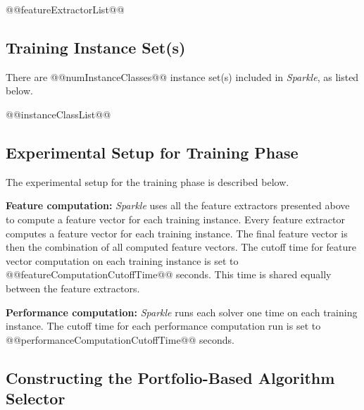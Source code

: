 \documentclass[british]{article}
\newif\iftest
\begin{document}
\begin{enumerate}
@@featureExtractorList@@
\end{enumerate}

\subsection{Training Instance Set(s)}
\label{sec:Train_Instance_Sets}
There are @@numInstanceClasses@@ instance set(s) included in \emph{Sparkle}, as listed below.

\begin{enumerate}
@@instanceClassList@@
\end{enumerate}

\iftest
\subsection{Test Instance Set}
\label{sec:Test_Instance_Set}

\begin{itemize}
\item Testing set: @@testInstanceClass@@, consisting of @@numInstanceInTestInstanceClass@@ instances
\end{itemize}
\fi

\subsection{Experimental Setup for Training Phase}
\label{sec:Experimental_Setup_for_Training_Phase}

The experimental setup for the training phase is described below.

\textbf{Feature computation:} \emph{Sparkle} uses all the feature extractors presented above to compute a feature vector for each training instance. Every feature extractor computes a feature vector for each training instance. The final feature vector is then the combination of all computed feature vectors. The cutoff time for feature vector computation on each training instance is set to @@featureComputationCutoffTime@@ seconds. This time is shared equally between the feature extractors.

\textbf{Performance computation:} \emph{Sparkle} runs each solver one time on each training instance. The cutoff time for each performance computation run is set to @@performanceComputationCutoffTime@@ seconds.

\subsection{Constructing the Portfolio-Based Algorithm Selector}
\label{sec:Portfolio}
\end{document}
